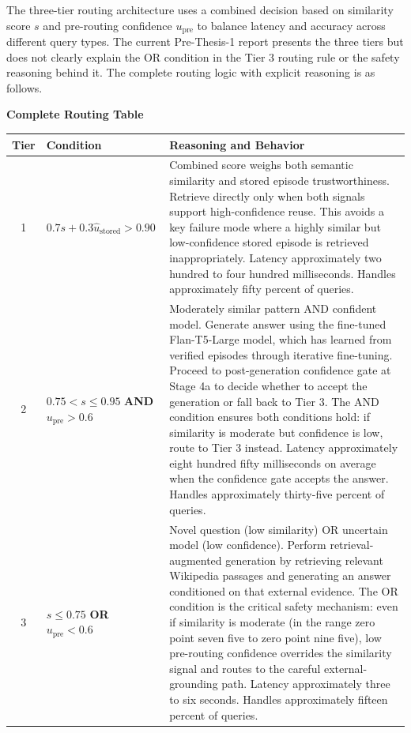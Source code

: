 \documentclass[11pt,a4paper]{article}
\newcommand{\architecturebox}[2]{%
\begin{tcolorbox}[enhanced,breakable,
  colback=LightTeal,colframe=Teal,boxrule=1.5pt,arc=4pt,
  left=8pt,right=8pt,top=6pt,bottom=6pt,
  title={\bfseries\small\color{white}#1},
  attach boxed title to top left={yshift=-2mm,xshift=6mm},
  boxed title style={colback=Teal,arc=3pt,boxrule=0pt,
    left=4pt,right=4pt,top=2pt,bottom=2pt}]
#2
\end{tcolorbox}}
\newcommand{\upre}{u_{\text{pre}}}
\newcommand{\ustored}{\hat{u}_{\text{stored}}}
\begin{document}
\architecturebox{ARCHITECTURE UPDATE 3: Three-Tier Routing with OR Condition and Safety Reasoning}{
The three-tier routing architecture uses a combined decision based on similarity score $s$ and pre-routing confidence $\upre$ to balance latency and accuracy across different query types. The current Pre-Thesis-1 report presents the three tiers but does not clearly explain the OR condition in the Tier 3 routing rule or the safety reasoning behind it. The complete routing logic with explicit reasoning is as follows.

\textbf{Complete Routing Table}

\begin{center}
\small
\begin{tabular}{clp{7cm}}
\toprule
\textbf{Tier} & \textbf{Condition} & \textbf{Reasoning and Behavior} \\
\midrule
1 & $0.7s + 0.3\ustored > 0.90$ & Combined score weighs both semantic similarity and stored episode trustworthiness. Retrieve directly only when both signals support high-confidence reuse. This avoids a key failure mode where a highly similar but low-confidence stored episode is retrieved inappropriately. Latency approximately two hundred to four hundred milliseconds. Handles approximately fifty percent of queries. \\[6pt]
2 & $0.75 < s \leq 0.95$ \textbf{AND} $\upre > 0.6$ & Moderately similar pattern AND confident model. Generate answer using the fine-tuned Flan-T5-Large model, which has learned from verified episodes through iterative fine-tuning. Proceed to post-generation confidence gate at Stage 4a to decide whether to accept the generation or fall back to Tier 3. The AND condition ensures both conditions hold: if similarity is moderate but confidence is low, route to Tier 3 instead. Latency approximately eight hundred fifty milliseconds on average when the confidence gate accepts the answer. Handles approximately thirty-five percent of queries. \\[6pt]
3 & $s \leq 0.75$ \textbf{OR} $\upre < 0.6$ & Novel question (low similarity) OR uncertain model (low confidence). Perform retrieval-augmented generation by retrieving relevant Wikipedia passages and generating an answer conditioned on that external evidence. The OR condition is the critical safety mechanism: even if similarity is moderate (in the range zero point seven five to zero point nine five), low pre-routing confidence overrides the similarity signal and routes to the careful external-grounding path. Latency approximately three to six seconds. Handles approximately fifteen percent of queries. \\
\bottomrule
\end{tabular}
\end{center}

}
\end{document}

